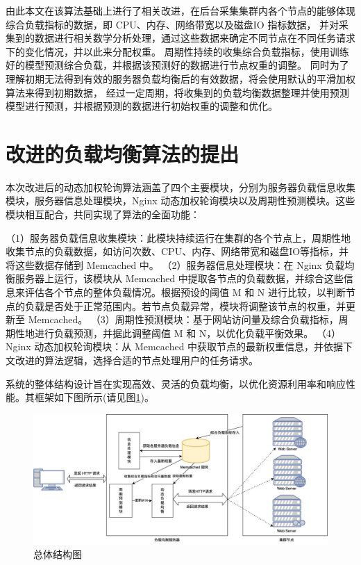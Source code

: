 由此本文在该算法基础上进行了相关改进，在后台采集集群内各个节点的能够体现综合负载指标的数据，即 CPU、内存、网络带宽以及磁盘IO 指标数据，
并对采集到的数据进行相关数学分析处理，通过这些数据来确定不同节点在不同任务请求下的变化情况，并以此来分配权重。
周期性持续的收集综合负载指标，使用训练好的模型预测综合负载，并根据该预测好的数据进行节点权重的调整。
同时为了理解初期无法得到有效的服务器负载均衡后的有效数据，将会使用默认的平滑加权算法来得到初期数据，
经过一定周期，将收集到的负载均衡数据整理并使用预测模型进行预测，并根据预测的数据进行初始权重的调整和优化。

\section{改进的负载均衡算法的提出}
本次改进后的动态加权轮询算法涵盖了四个主要模块，分别为服务器负载信息收集模块，服务器信息处理模块，Nginx 动态加权轮询模块以及周期性预测模块。这些模块相互配合，共同实现了算法的全面功能：

（1）服务器负载信息收集模块：此模块持续运行在集群的各个节点上，周期性地收集节点的负载数据，如访问次数、CPU、内存、网络带宽和磁盘IO等指标，并将这些数据存储到 Memcached 中。
（2）服务器信息处理模块：在 Nginx 负载均衡服务器上运行，该模块从 Memcached 中提取各节点的负载数据，并综合这些信息来评估各个节点的整体负载情况。根据预设的阈值 M 和 N 进行比较，以判断节点的负载是否处于正常范围内。若节点负载异常，模块将调整该节点的权重，并更新至 Memcached。
（3）周期性预测模块：基于网站访问量及综合负载指标，周期性地进行负载预测，并据此调整阈值 M 和 N，以优化负载平衡效果。
（4）Nginx 动态加权轮询模块：从 Memcached 中获取节点的最新权重信息，并依据下文改进的算法逻辑，选择合适的节点处理用户的任务请求。

系统的整体结构设计旨在实现高效、灵活的负载均衡，以优化资源利用率和响应性能。其框架如下图所示(请见图\ref{total_structure_flow})。

\begin{figure}[htbp]
	\centering
	\includegraphics[width=\textwidth]{figures/landbalance_module.png}
	\caption{总体结构图}
	\label{total_structure_flow}
\end{figure}

